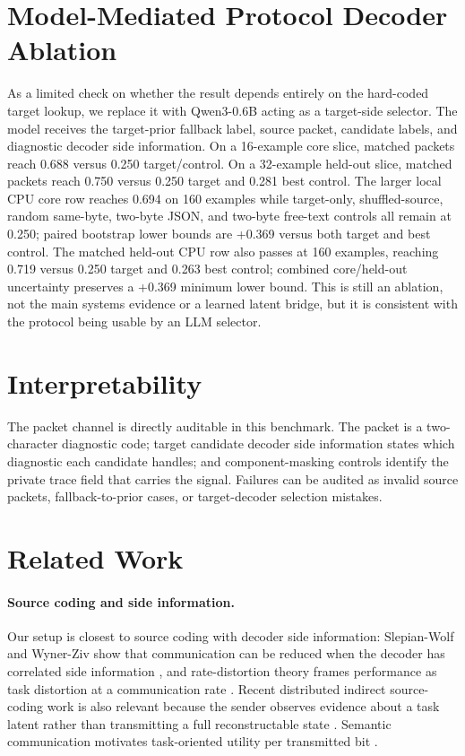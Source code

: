 \documentclass{article}
\begin{document}
\section{Model-Mediated Protocol Decoder Ablation}
\label{sec:target-decoder}

As a limited check on whether the result depends entirely on the hard-coded
target lookup, we replace it with Qwen3-0.6B acting as a target-side selector.
The model receives the target-prior fallback label, source packet, candidate
labels, and diagnostic decoder side information. On a 16-example core slice,
matched packets reach 0.688 versus 0.250 target/control. On a 32-example
held-out slice, matched packets reach 0.750 versus 0.250 target and 0.281 best
control. The larger local CPU core row reaches 0.694 on 160 examples while
target-only, shuffled-source, random same-byte, two-byte JSON, and two-byte
free-text controls all remain at 0.250; paired bootstrap lower bounds are
+0.369 versus both target and best control. The matched held-out CPU row also
passes at 160 examples, reaching 0.719 versus 0.250 target and 0.263 best
control; combined core/held-out uncertainty preserves a +0.369 minimum lower
bound. This is still an ablation, not the main systems evidence or a learned
latent bridge, but it is consistent with the protocol being usable by an LLM
selector.

\section{Interpretability}

The packet channel is directly auditable in this benchmark. The packet is a
two-character diagnostic code; target candidate decoder side information states
which diagnostic each candidate handles; and component-masking controls
identify the private trace field that carries the signal. Failures can be
audited as invalid source packets, fallback-to-prior cases, or target-decoder
selection mistakes.

\section{Related Work}

\paragraph{Source coding and side information.}
Our setup is closest to source coding with decoder side information:
Slepian-Wolf and Wyner-Ziv show that communication can be reduced when the
decoder has correlated side information
\citep{slepian1973noiseless,wyner1976rate}, and rate-distortion theory frames
performance as task distortion at a communication rate
\citep{shannon1959coding}. Recent distributed indirect source-coding work is
also relevant because the sender observes evidence about a task latent rather
than transmitting a full reconstructable state \citep{tang2024distributed}.
Semantic communication motivates task-oriented utility per transmitted bit
\citep{xie2021deep}.
\end{document}
